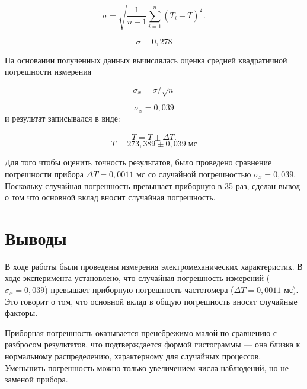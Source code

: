 \documentclass[a4paper,14pt]{extarticle}
\theoremstyle{plain}
\theoremstyle{remark}
\theoremstyle{definition}
\begin{document}
\begin{equation}
\sigma = \sqrt{\frac{1}{n-1}\sum_{i=1}^{n}(T_i - \overline{T})^2}.
\end{equation}

\begin{equation}
\sigma = 0,278
\end{equation}

На основании полученных данных вычислялась оценка средней квадратичной погрешности измерения

\begin{equation}
\sigma_{x} = \sigma/\sqrt{n}
\end{equation}

\begin{equation}
\sigma_{x} = 0,039
\end{equation}
и результат записывался в виде:

\[
T = \overline{T} \pm \Delta T.
\]
\begin{equation}
T = 273,389 \pm 0,039 \; \text{мс}
\end{equation} 

Для того чтобы оценить точность результатов, было проведено сравнение погрешности прибора $\Delta T = 0,0011$ мс со случайной погрешностью $\sigma_{x} = 0,039$. Поскольку случайная погрешность превышает приборную в 35 раз, сделан вывод о том что основной вклад вносит случайная погрешность.

\section{Выводы}

В ходе работы были проведены измерения электромеханических характеристик. В ходе эксперимента установлено, что случайная погрешность измерений ($\sigma_{x} = 0,039$) превышает приборную погрешность частотомера ($\Delta T = 0,0011$ мс). 
Это говорит о том, что основной вклад в общую погрешность вносят случайные факторы. 

Приборная погрешность оказывается пренебрежимо малой по сравнению с разбросом результатов, что подтверждается формой гистограммы — она близка к нормальному распределению, характерному для случайных процессов. Уменьшить погрешность можно только увеличением числа наблюдений, но не заменой прибора.
\clearpage
\appendix
\end{document}
